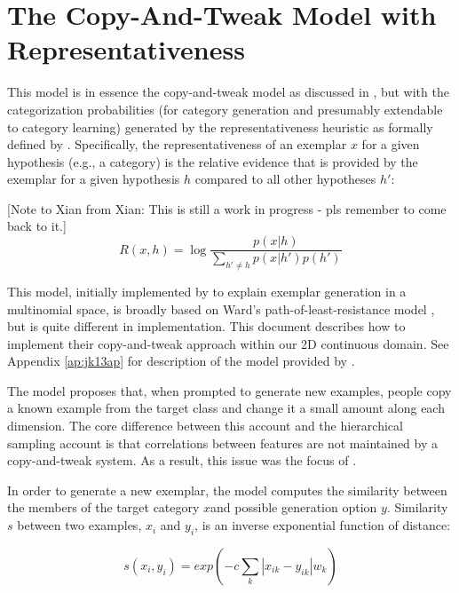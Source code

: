 \documentclass[12pt]{article} \usepackage[letterpaper, margin=1in,
\begin{document}
\section{The Copy-And-Tweak Model with Representativeness}

This model is in essence the copy-and-tweak model as discussed in
\cite{jern2013probabilistic}, but with the categorization probabilities (for
category generation and presumably extendable to category learning) generated by
the representativeness heuristic as formally defined by \cite{tenenbaum01}.
Specifically, the representativeness of an exemplar $x$ for a given hypothesis
(e.g., a category) is the relative evidence that is provided by the exemplar for
a given hypothesis $h$ compared to all other hypotheses $h'$:

[Note to Xian from Xian: This is still a work in progress - pls remember to come
back to it.]
\begin{equation}
  R(x,h) = \log \dfrac{p(x|h)}{\sum_{h'\neq h}{p(x|h')p(h')}}
\label{representativeness}
\end{equation}

This model,
initially implemented by \cite{jern2013probabilistic} to explain exemplar
generation in a multinomial space, is broadly based on Ward's
path-of-least-resistance model
\citep{ward1994structured,ward1995s,ward2002role}, but is quite different in
implementation. This document describes how to implement their copy-and-tweak
approach within our 2D continuous domain. See Appendix \ref{ap:jk13ap} for
description of the model provided by \cite{jern2013probabilistic}.

The model proposes that, when prompted to generate new examples, people copy a
known example from the target class and change it a small amount along each
dimension. The core difference between this account and the hierarchical
sampling account is that correlations between features are not maintained by a
copy-and-tweak system. As a result, this issue was the focus of
\cite{jern2013probabilistic}.

In order to generate a new exemplar, the model computes the similarity between
the members of the target category $x$and possible generation option $y$.
Similarity $s$ between two examples, $x_i$ and $y_i$, is an inverse exponential
function of distance:

\begin{equation} s(x_i,y_i) = exp( -c \sum_k{|x_{ik} - y_{ik}|w_k})
\end{equation}
\end{document}
